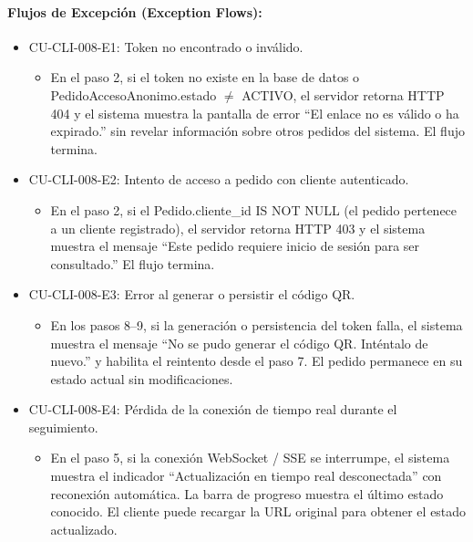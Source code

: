 \paragraph{Flujos de Excepción (Exception Flows):}
\begin{itemize}
    \item CU-CLI-008-E1: Token no encontrado o inválido.
    \begin{itemize}
        \item En el paso 2, si el token no existe en la base de datos o PedidoAccesoAnonimo.estado $\neq$ ACTIVO, el servidor retorna HTTP 404 y el sistema muestra la pantalla de error ``El enlace no es válido o ha expirado.'' sin revelar información sobre otros pedidos del sistema. El flujo termina.
    \end{itemize}
    \item CU-CLI-008-E2: Intento de acceso a pedido con cliente autenticado.
    \begin{itemize}
        \item En el paso 2, si el Pedido.cliente\_id IS NOT NULL (el pedido pertenece a un cliente registrado), el servidor retorna HTTP 403 y el sistema muestra el mensaje ``Este pedido requiere inicio de sesión para ser consultado.'' El flujo termina.
    \end{itemize}
    \item CU-CLI-008-E3: Error al generar o persistir el código QR.
    \begin{itemize}
        \item En los pasos 8--9, si la generación o persistencia del token falla, el sistema muestra el mensaje ``No se pudo generar el código QR. Inténtalo de nuevo.'' y habilita el reintento desde el paso 7. El pedido permanece en su estado actual sin modificaciones.
    \end{itemize}
    \item CU-CLI-008-E4: Pérdida de la conexión de tiempo real durante el seguimiento.
    \begin{itemize}
        \item En el paso 5, si la conexión WebSocket / SSE se interrumpe, el sistema muestra el indicador ``Actualización en tiempo real desconectada'' con reconexión automática. La barra de progreso muestra el último estado conocido. El cliente puede recargar la URL original para obtener el estado actualizado.
    \end{itemize}
\end{itemize}

